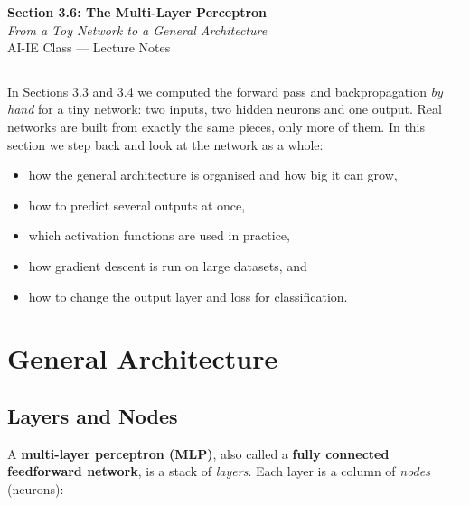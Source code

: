 \documentclass[12pt, a4paper]{article}
\begin{document}
\begin{center}
  {\LARGE \textbf{Section 3.6: The Multi-Layer Perceptron}} \\[0.3em]
  {\large\itshape From a Toy Network to a General Architecture} \\[0.5em]
  {\large AI-IE Class --- Lecture Notes}%
  \ifstudentmode
  \fi
\end{center}

\vspace{1em}
\hrule
\vspace{1.5em}

In Sections 3.3 and 3.4 we computed the forward pass and backpropagation
\emph{by hand} for a tiny network: two inputs, two hidden neurons and one
output. Real networks are built from exactly the same pieces, only more of
them. In this section we step back and look at the network as a whole:
\begin{itemize}[nosep]
  \item how the general architecture is organised and how big it can grow,
  \item how to predict several outputs at once,
  \item which activation functions are used in practice,
  \item how gradient descent is run on large datasets, and
  \item how to change the output layer and loss for classification.
\end{itemize}

\section{General Architecture}

\subsection{Layers and Nodes}

A \textbf{multi-layer perceptron (MLP)}, also called a
\textbf{fully connected feedforward network}, is a stack of \emph{layers}.
Each layer is a column of \emph{nodes} (neurons):
\end{document}

